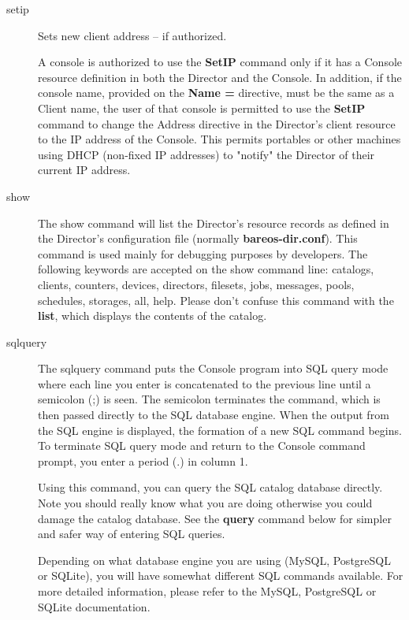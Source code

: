 \begin{description}
\item [setip]
   \label{bcommandSetIP}
   Sets new client address -- if authorized.

   A console is authorized to use the {\bf SetIP} command only if it has a
   Console resource definition in both the Director and the Console.  In
   addition, if the console name, provided on the {\bf Name =} directive,
   must be the same as a Client name, the user of that console is permitted
   to use the {\bf SetIP} command to change the Address directive in the
   Director's client resource to the IP address of the Console.  This
   permits portables or other machines using DHCP (non-fixed IP addresses)
   to "notify" the Director of their current IP address.

\item [show]
   The show command will list the Director's resource records as defined in
   the Director's configuration file (normally {\bf bareos-dir.conf}).
   This command is used mainly for debugging purposes by developers.
   The following keywords are accepted on the
   show command line: catalogs, clients, counters, devices, directors,
   filesets, jobs, messages, pools, schedules, storages, all, help.
   Please don't confuse this command
   with the {\bf list}, which displays the contents of the catalog.

\item [sqlquery]
   The sqlquery command puts the Console program into SQL query mode where
   each line you enter is concatenated to the previous line until a
   semicolon (;) is seen.  The semicolon terminates the command, which is
   then passed directly to the SQL database engine.  When the output from
   the SQL engine is displayed, the formation of a new SQL command begins.
   To terminate SQL query mode and return to the Console command prompt,
   you enter a period (.) in column 1.

   Using this command, you can query the SQL catalog database directly.
   Note you should really know what you are doing otherwise you could
   damage the catalog database.  See the {\bf query} command below for
   simpler and safer way of entering SQL queries.

   Depending on what database engine you are using (MySQL, PostgreSQL or
   SQLite), you will have somewhat different SQL commands available.  For
   more detailed information, please refer to the MySQL, PostgreSQL or
   SQLite documentation.


\end{description}
